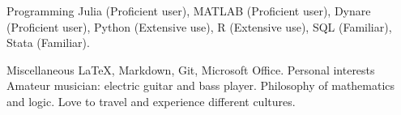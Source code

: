

\begin{cvskills}

  \cvskill
    {Programming} %
    {Julia (Proficient user), MATLAB (Proficient user), Dynare (Proficient user), Python (Extensive use), R (Extensive use), \newline SQL (Familiar), Stata (Familiar).} %

  \cvskill
    {Miscellaneous} %
    {\LaTeX, Markdown, Git, Microsoft Office.} %
  \cvskill
    {Personal interests} %
    {Amateur musician: electric guitar and bass player. Philosophy of mathematics and logic. Love to travel and experience \newline different cultures.} %

\end{cvskills}
